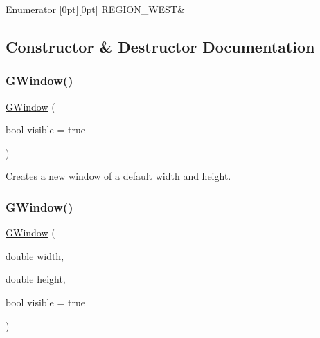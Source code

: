 \begin{DoxyEnumFields}{Enumerator}
[0pt][0pt]{}\mbox{\label{classsgl_1_1GWindow_a81a01a86de31071a92e6cce0bab9bc4ba5dd8c2219af001263c00de02b642786d}} 
R\+E\+G\+I\+O\+N\+\_\+\+W\+E\+ST&\\
\hline

\end{DoxyEnumFields}


\subsection{Constructor \& Destructor Documentation}
\mbox{\label{classsgl_1_1GWindow_a7fdeab875fb526a49423085ac13ac9f2}} 
\subsubsection{\texorpdfstring{G\+Window()}{GWindow()}\hspace{0.1cm}{\footnotesize\ttfamily [1/3]}}
{\footnotesize\ttfamily \mbox{\hyperlink{classsgl_1_1GWindow}{G\+Window}} (\begin{DoxyParamCaption}\item[{bool}]{visible = {\ttfamily true} }\end{DoxyParamCaption})}



Creates a new window of a default width and height. 

\mbox{\label{classsgl_1_1GWindow_acb88532777f61b140aa8245ed1d9887e}} 
\subsubsection{\texorpdfstring{G\+Window()}{GWindow()}\hspace{0.1cm}{\footnotesize\ttfamily [2/3]}}
{\footnotesize\ttfamily \mbox{\hyperlink{classsgl_1_1GWindow}{G\+Window}} (\begin{DoxyParamCaption}\item[{double}]{width,  }\item[{double}]{height,  }\item[{bool}]{visible = {\ttfamily true} }\end{DoxyParamCaption})}



